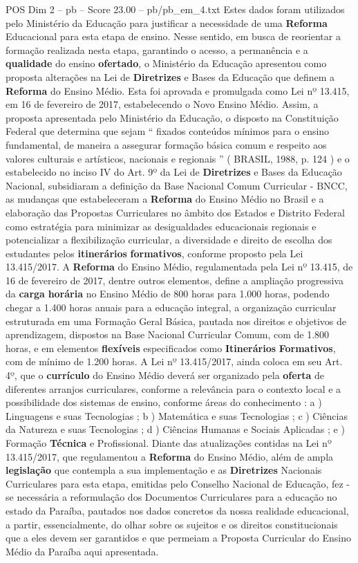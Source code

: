 \begin{textsample}{POS Dim 2 – pb – Score 23.00 – pb/pb\_em\_4.txt}
Estes dados foram utilizados pelo Ministério da Educação para justificar a necessidade de uma \textbf{Reforma} Educacional para esta etapa de ensino.
Nesse sentido, em busca de reorientar a formação realizada nesta etapa, garantindo o acesso, a permanência e a \textbf{qualidade} do ensino \textbf{ofertado}, o Ministério da Educação apresentou como proposta alterações na Lei de \textbf{Diretrizes} e Bases da Educação que definem a \textbf{Reforma} do Ensino Médio.
Esta foi aprovada e promulgada como Lei nº 13.415, em 16 de fevereiro de 2017, estabelecendo o Novo Ensino Médio.
Assim, a proposta apresentada pelo Ministério da Educação, o disposto na Constituição Federal que determina que sejam “ fixados conteúdos mínimos para o ensino fundamental, de maneira a assegurar formação básica comum e respeito aos valores culturais e artísticos, nacionais e regionais ” ( BRASIL, 1988, p. 124 ) e o estabelecido no inciso IV do Art. 9º da Lei de \textbf{Diretrizes} e Bases da Educação Nacional, subsidiaram a definição da Base Nacional Comum Curricular - BNCC, as mudanças que estabeleceram a \textbf{Reforma} do Ensino Médio no Brasil e a elaboração das Propostas Curriculares no âmbito dos Estados e Distrito Federal como estratégia para minimizar as desigualdades educacionais regionais e potencializar a flexibilização curricular, a diversidade e direito de escolha dos estudantes pelos \textbf{itinerários} \textbf{formativos}, conforme proposto pela Lei 13.415/2017.
A \textbf{Reforma} do Ensino Médio, regulamentada pela Lei nº 13.415, de 16 de fevereiro de 2017, dentre outros elementos, define a ampliação progressiva da \textbf{carga} \textbf{horária} no Ensino Médio de 800 horas para 1.000 horas, podendo chegar a 1.400 horas anuais para a educação integral, a organização curricular estruturada em uma Formação Geral Básica, pautada nos direitos e objetivos de aprendizagem, dispostos na Base Nacional Curricular Comum, com de 1.800 horas, e em elementos \textbf{flexíveis} especificados como \textbf{Itinerários} \textbf{Formativos}, com de mínimo de 1.200 horas.
A Lei nº 13.415/2017, ainda coloca em seu Art. 4º, que o \textbf{currículo} do Ensino Médio deverá ser organizado pela \textbf{oferta} de diferentes arranjos curriculares, conforme a relevância para o contexto local e a possibilidade dos sistemas de ensino, conforme áreas do conhecimento : a ) Linguagens e suas Tecnologias ; b ) Matemática e suas Tecnologias ; c ) Ciências da Natureza e suas Tecnologias ; d ) Ciências Humanas e Sociais Aplicadas ; e ) Formação \textbf{Técnica} e Profissional.
Diante das atualizações contidas na Lei nº 13.415/2017, que regulamentou a \textbf{Reforma} do Ensino Médio, além de ampla \textbf{legislação} que contempla a sua implementação e as \textbf{Diretrizes} Nacionais Curriculares para esta etapa, emitidas pelo Conselho Nacional de Educação, fez -se necessária a reformulação dos Documentos Curriculares para a educação no estado da Paraíba, pautados nos dados concretos da nossa realidade educacional, a partir, essencialmente, do olhar sobre os sujeitos e os direitos constitucionais que a eles devem ser garantidos e que permeiam a Proposta Curricular do Ensino Médio da Paraíba aqui apresentada.


\end{textsample}
